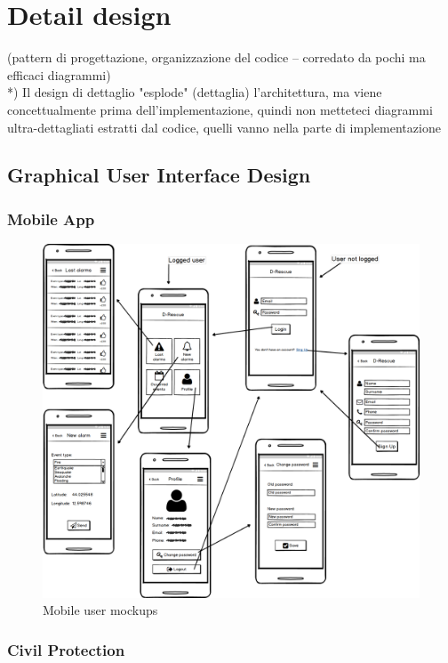 \documentclass[a4paper,12pt]{report}
\begin{document}
\chapter{Detail design}
(pattern di progettazione, organizzazione del codice -- corredato da pochi ma efficaci diagrammi)\\
*) Il design di dettaglio "esplode" (dettaglia) l'architettura, ma viene concettualmente prima dell'implementazione, quindi non metteteci diagrammi ultra-dettagliati estratti dal codice, quelli vanno nella parte di implementazione

\section{Graphical User Interface Design}
\subsection{Mobile App}

\begin{figure}[ht]
\centering
\includegraphics[width=\textwidth]{figures/mockupMobile.png}
\caption{Mobile user mockups}
\label{fig:Mobilemockup}
\end{figure}

\subsection{Civil Protection}
\end{document}
